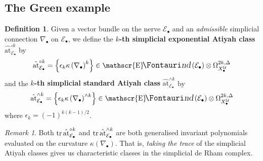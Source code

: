 \documentclass[11pt,fleqn]{article}
\theoremstyle{plain}
\theoremstyle{definition}
\newtheorem{definition}[theorem]{Definition}
\theoremstyle{remark}
\newtheorem{remark}[theorem]{Remark}
\numberwithin{equation}{theorem}
\newcommand{\cover}{\mathcal{U}}
\newcommand{\at}{\mathrm{at}}
\newcommand{\simpexpat}[1]{\hat{\at}^{\circ#1}}
\newcommand{\simpstanat}[1]{\hat{\at}^{\wedge#1}}
\newcommand{\define}[1]{\textbf{#1}}
\newcommand{\nerve}[1]{X_{#1}^\cover}
\DeclareMathOperator{\sheafend}{\mathscr{E}\textup{\kern -2pt {\large\Fontauri\slshape nd}}\,}
\begin{document}
    \subsection{The Gre{}en example}

        \begin{definition}
            Given a vector bundle on the nerve $\mathcal{E}_\bullet$ and an \emph{admissible} simplicial connection $\nabla_\bullet$ on $\mathcal{E}_\bullet$, we define the \define{$k$-th simplicial exponential Atiyah class} $\simpexpat{k}_{\mathcal{E}_\bullet}$ by
            \begin{equation*}
                \simpexpat{k}_{\mathcal{E}_\bullet}
                =
                \left\{
                    \epsilon_k\kappa\left(\nabla_\bullet\right)^k
                \right\}
                \in
                \sheafend(\mathcal{E}_\bullet)\otimes\Omega_{\nerve{\bullet}}^{2k,\Delta}
            \end{equation*}
            and the \define{$k$-th simplicial standard Atiyah class} $\simpstanat{k}_{\mathcal{E}_\bullet}$ by
            \begin{equation*}
                \simpstanat{k}_{\mathcal{E}_\bullet}
                =
                \left\{
                    \epsilon_k\kappa\left(\nabla_\bullet\right)^{\wedge k}
                \right\}
                \in
                \sheafend(\mathcal{E}_\bullet)\otimes\Omega_{\nerve{\bullet}}^{2k,\Delta}
            \end{equation*}
            where $\epsilon_k=(-1)^{k(k-1)/2}$.
        \end{definition}

        \begin{remark}
            Both $\tr\simpexpat{k}_{\mathcal{E}_\bullet}$ and $\tr\simpstanat{k}_{\mathcal{E}_\bullet}$ are both generalised invariant polynomials evaluated on the curvature $\kappa(\nabla_\bullet)$.
            That is, \emph{taking the trace} of the simplicial Atiyah classes gives us characteristic classes in the simplicial de Rham complex.
        \end{remark}
\end{document}
